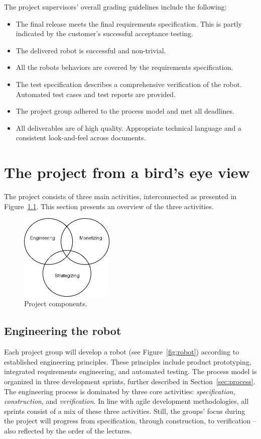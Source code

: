 \documentclass{scrreprt}
\begin{document}
The project supervisors' overall grading guidelines include the following:
\begin{itemize}
\item The final release meets the final requirements specification. This is partly indicated by the customer's successful acceptance testing.
\item The delivered robot is successful and non-trivial.
\item All the robots behaviors are covered by the requirements specification.
\item The test specification describes a comprehensive verification of the robot. Automated test cases and test reports are provided.
\item The project group adhered to the process model and met all deadlines.
\item All deliverables are of high quality. Appropriate technical language and a consistent look-and-feel across documents.
\end{itemize}

\chapter{The project from a bird's eye view}
The project consists of three main activities, interconnected as presented in Figure~\ref{fig:components}. This section presents an overview of the three activities.

\begin{figure}
\centering
\includegraphics[width=0.40\textwidth]{figures/projectComponents.png}
\caption{Project components.}
\label{fig:components}
\end{figure}

\section{Engineering the robot}
Each project group will develop a robot (see Figure~\ref{fig:robot}) according to established engineering principles. These principles include product prototyping, integrated requirements engineering, and automated testing. The process model is organized in three development sprints, further described in Section~\ref{sec:process}. The engineering process is dominated by three core activities: \textit{specification}, \textit{construction}, and \textit{verification}. In line with agile development methodologies, all sprints consist of a mix of these three activities. Still, the groups' focus during the project will progress from specification, through construction, to verification -- also reflected by the order of the lectures.
\end{document}
